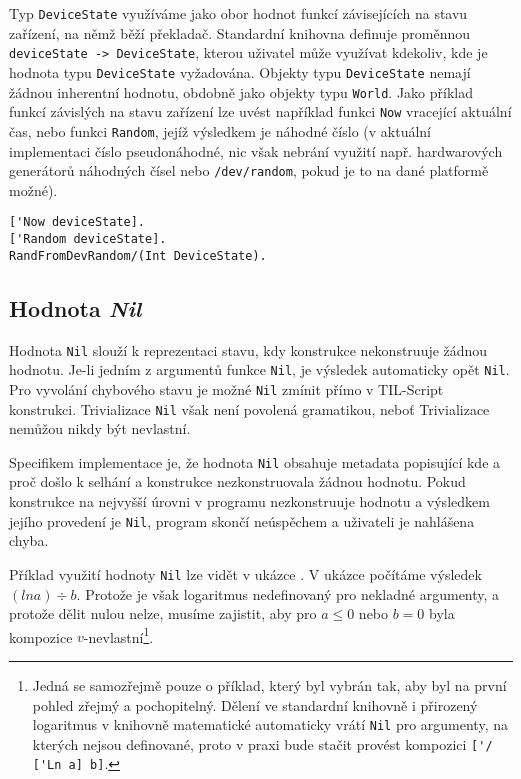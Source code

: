 Typ \lstinline{DeviceState} využíváme jako obor hodnot funkcí závisejících na stavu zařízení,
na němž běží překladač. Standardní knihovna definuje proměnnou
\lstinline{deviceState -> DeviceState}, kterou uživatel může využívat kdekoliv, kde je hodnota typu
\lstinline{DeviceState} vyžadována. Objekty typu \lstinline{DeviceState} nemají žádnou inherentní
hodnotu, obdobně jako objekty typu \lstinline{World}. Jako příklad funkcí závislých na stavu
zařízení lze uvést například funkci \lstinline{Now} vracející aktuální čas, nebo funkci
\lstinline{Random}, jejíž výsledkem je náhodné číslo (v aktuální implementaci číslo pseudonáhodné,
nic však nebrání využití např. hardwarových generátorů náhodných čísel nebo
\lstinline{/dev/random}, pokud je to na dané platformě možné).

\begin{lstlisting}[caption={Příklad funkcí závislých na stavu zařízení}]
['Now deviceState].
['Random deviceState].
RandFromDevRandom/(Int DeviceState).
\end{lstlisting}

\subsection{Hodnota \textit{Nil}}\label{nil-value}

Hodnota \lstinline{Nil} slouží k reprezentaci stavu, kdy konstrukce nekonstruuje žádnou hodnotu.
Je-li jedním z argumentů funkce \lstinline{Nil}, je výsledek automaticky opět \lstinline{Nil}.
Pro vyvolání chybového stavu je možné \lstinline{Nil} zmínit přímo v TIL-Script konstrukci.
Trivializace \lstinline{Nil} však není povolená gramatikou, neboť Trivializace nemůžou nikdy
být nevlastní\cite{til-duzi}.

Specifikem implementace je, že hodnota \lstinline{Nil} obsahuje metadata popisující kde a proč
došlo k selhání a konstrukce nezkonstruovala žádnou hodnotu. Pokud konstrukce na nejvyšší úrovni
v programu nezkonstruuje hodnotu a výsledkem jejího provedení je \lstinline{Nil}, program skončí
neúspěchem a uživateli je nahlášena chyba.

Příklad využití hodnoty \lstinline{Nil} lze vidět v ukázce . V ukázce počítáme
výsledek $(ln a) \div b$. Protože je však logaritmus nedefinovaný pro nekladné argumenty, a protože
dělit nulou nelze, musíme zajistit, aby pro $a \le 0$ nebo $b = 0$ byla kompozice
$v$-nevlastní\footnote{
  Jedná se samozřejmě pouze o příklad, který byl vybrán tak, aby byl na první pohled zřejmý
  a pochopitelný. Dělení ve standardní knihovně i přirozený logaritmus v knihovně matematické
  automaticky vrátí \lstinline{Nil} pro argumenty, na kterých nejsou definované, proto v praxi bude
  stačit provést kompozici \lstinline{['/ ['Ln a] b]}.
}.

